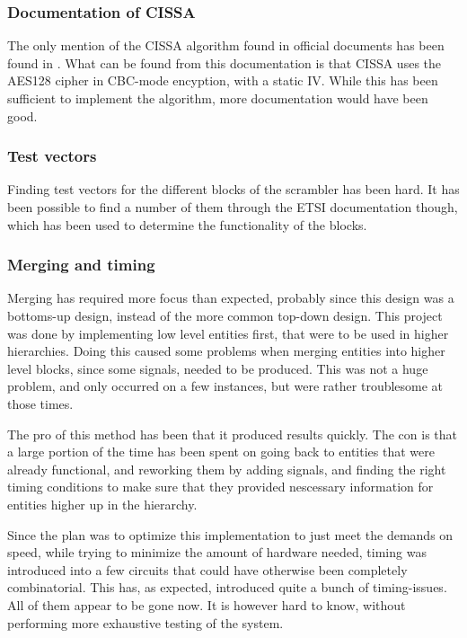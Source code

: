 \subsubsection{Documentation of CISSA}
The only mention of the CISSA algorithm found in official documents 
has been found in \citet{DVB:2013}. What can be found from this 
documentation is that CISSA uses the AES128 cipher in CBC-mode 
encyption, with a static IV. While this has been sufficient to 
implement the algorithm, more documentation would have been good.

\subsubsection{Test vectors}
Finding test vectors for the different blocks of the scrambler has 
been hard. It has been possible to find a number of them through the 
ETSI documentation though, which has been used to determine the 
functionality of the blocks.

\subsubsection{Merging and timing} \label{ssec:merge}
Merging has required more focus than expected, probably since this 
design was a bottoms-up design, instead of the more common top-down 
design. This project was done by implementing low level entities 
first, that were to be used in higher hierarchies. Doing this caused 
some problems when merging entities into higher level blocks, since 
some signals, needed to be produced. This was not a huge problem, and 
only occurred on a few instances, but were rather troublesome at those 
times.

The pro of this method has been that it produced results quickly. The 
con is that a large portion of the time has been spent on going back 
to entities that were already functional, and reworking them by adding 
signals, and finding the right timing conditions to make sure that 
they provided nescessary information for entities higher up in the 
hierarchy.

Since the plan was to optimize this implementation to just meet the 
demands on speed, while trying to minimize the amount of hardware 
needed, timing was introduced into a few circuits that could have 
otherwise been completely combinatorial. This has, as expected, 
introduced quite a bunch of timing-issues. All of them appear to be 
gone now. It is however hard to know, without performing more 
exhaustive testing of the system.


